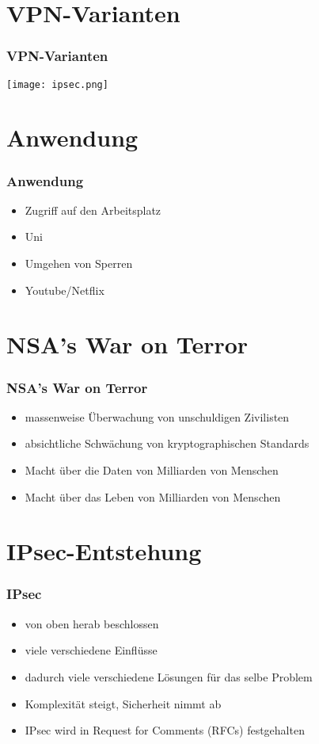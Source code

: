 \documentclass[t]{beamer}
\begin{document}
\section{VPN-Varianten}
\begin{frame}
	\frametitle{VPN-Varianten}
	\vfill
	\texttt{[image: ipsec.png]}
\end{frame}

\section{Anwendung}
\begin{frame}
	\frametitle{Anwendung}
	\begin{itemize}
		\vfill
		\item Zugriff auf den Arbeitsplatz
		\vfill
		\item Uni
		\vfill
		\item Umgehen von Sperren
		\vfill
		\item Youtube/Netflix
	\end{itemize}
\end{frame}

\section{NSA's War on Terror}
\begin{frame}
	\frametitle{NSA's War on Terror}
	\begin{itemize}
		\item massenweise Überwachung von unschuldigen Zivilisten
		\item absichtliche Schwächung von kryptographischen Standards
		\item Macht über die Daten von Milliarden von Menschen
		\item Macht über das Leben von Milliarden von Menschen
	\end{itemize}

	
\end{frame}

\section{IPsec-Entstehung}
\begin{frame}
	\frametitle{IPsec}
	\begin{itemize}
		\vfill
		\item von oben herab beschlossen
		\vfill
		\item viele verschiedene Einflüsse
		\vfill
		\item dadurch viele verschiedene Lösungen für das selbe Problem
		\vfill
		\item Komplexität steigt, Sicherheit nimmt ab
		\vfill
		\item IPsec wird in Request for Comments (RFCs) festgehalten
		\vfill
	\end{itemize}
\end{frame}
\end{document}
